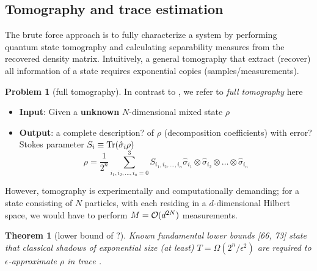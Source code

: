 \documentclass[
10pt,
aps,
pra,
linenumbers,
floatfix,
]{revtex4-2}
\theoremstyle{plain}
\newtheorem{theorem}{Theorem}
\theoremstyle{definition}
\newtheorem{problem}{Problem}
\newcommand{\dm}{\rho}
\begin{document}
\subsection{Tomography and trace estimation}
The brute force approach is to fully characterize a system by performing quantum state tomography and calculating separability measures from the recovered density matrix.
Intuitively, a general tomography \cite{altepeterPhotonicStateTomography2005} that extract (recover) all information of a state requires exponential copies (samples/measurements).
\begin{problem}[full tomography]\label{prm:full_tomography}
	In contrast to , we refer to \emph{full tomography} here
	\begin{itemize}
		\item \textbf{Input}: Given a \textbf{unknown} $N$-dimensional mixed state $\dm$
		\item \textbf{Output}: a complete description? of $\dm$ (decomposition coefficients) with error?
		Stokes parameter $S_i\equiv \Tr(\hat{\sigma}_i \dm)$
		\begin{equation}
			\dm = \frac{1}{2^n} \sum_{i_1,i_2,\dots,i_n=0}^3
			S_{i_1,i_2,\dots,i_n} 
			\hat{\sigma}_{i_1} \otimes \hat{\sigma}_{i_2} \otimes \dots \otimes \hat{\sigma}_{i_n} 
			\label{eq:stokes_tomography}
		\end{equation}
	\end{itemize}
\end{problem}
However, tomography is experimentally and computationally demanding; for a state consisting of $N$ particles, with each residing in a $d$-dimensional Hilbert space, we would have to perform $M = \mathcal{O}(d^{2N})$ measurements.
\begin{theorem}[lower bound of ?\cite{haahSampleoptimalTomographyQuantum2017}]
	Known fundamental lower bounds [66, 73] state that classical shadows of exponential size (at least) $T = \Omega( 2^n / \epsilon^2)$ are required to $\epsilon$-approximate $\dm$ in trace .
\end{theorem}
\end{document}
